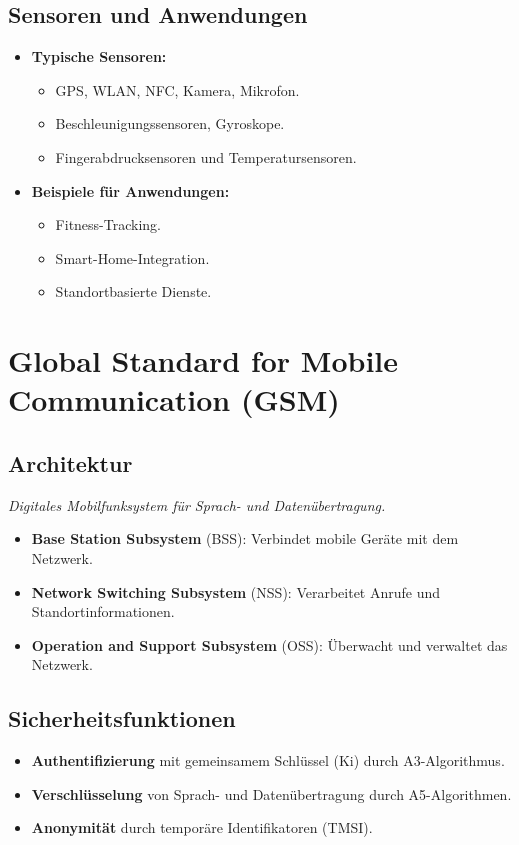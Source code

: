 \documentclass{article}
\begin{document}
\subsection{Sensoren und Anwendungen}
\begin{itemize}
    \item \textbf{Typische Sensoren:}
    \begin{itemize}
        \item GPS, WLAN, NFC, Kamera, Mikrofon.
        \item Beschleunigungssensoren, Gyroskope.
        \item Fingerabdrucksensoren und Temperatursensoren.
    \end{itemize}
    \item \textbf{Beispiele für Anwendungen:}
    \begin{itemize}
        \item Fitness-Tracking.
        \item Smart-Home-Integration.
        \item Standortbasierte Dienste.
    \end{itemize}
\end{itemize}



\section{Global Standard for Mobile Communication (GSM)}

\subsection{Architektur}
\textit{Digitales Mobilfunksystem für Sprach- und Datenübertragung.}
\begin{itemize}
    \item \textbf{Base Station Subsystem} (BSS): Verbindet mobile Geräte mit dem Netzwerk.
    \item \textbf{Network Switching Subsystem} (NSS): Verarbeitet Anrufe und Standortinformationen.
    \item \textbf{Operation and Support Subsystem} (OSS): Überwacht und verwaltet das Netzwerk.
\end{itemize}

\subsection{Sicherheitsfunktionen}
\begin{itemize}
    \item \textbf{Authentifizierung} mit gemeinsamem Schlüssel (Ki) durch A3-Algorithmus.
    \item \textbf{Verschlüsselung} von Sprach- und Datenübertragung durch A5-Algorithmen.
    \item \textbf{Anonymität} durch temporäre Identifikatoren (TMSI).
\end{itemize}
\end{document}
